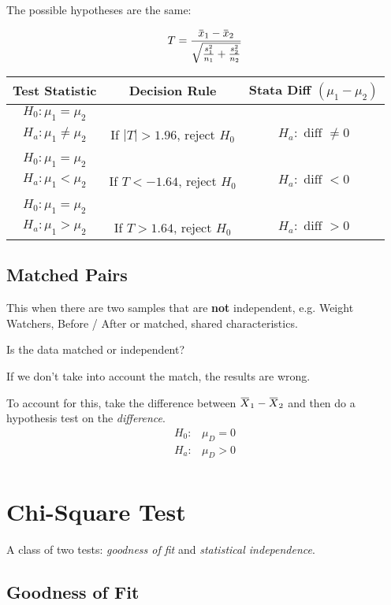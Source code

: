 \documentclass[11pt, oneside]{article}   	%
\newcommand{\overbar}[1]{\mkern 1.5mu\overline{\mkern-1.5mu#1\mkern-1.5mu}\mkern 1.5mu}
\begin{document}
The possible hypotheses are the same:

\[
T = \frac{\overbar{x}_1 - \overbar{x}_2 }  {\sqrt{\frac{s^2_1 } {n_1 } + \frac{s^2_2 } {n_2 }  } }
\]

 \begin{tabular}{ c  c c }
Test Statistic & Decision Rule & Stata Diff $(\mu_1 - \mu_2)$ \\
\hline
$H_0 : \mu_1 = \mu_2$ \\      $H_a : \mu_1 \neq \mu_2$ & If $|T| > 1.96$, reject $H_0$ & $H_a: \text{ diff } \neq 0$\\
 & \\
$H_0 : \mu_1 = \mu_2$ \\ $H_a : \mu_1 < \mu_2$      & If $T < -1.64$, reject $H_0$ & $H_a: \text{ diff } < 0$\\
 & \\
$H_0 : \mu_1 = \mu_2$ \\ $H_a : \mu_1 > \mu_2$      & If $T > 1.64$, reject $H_0$ & $H_a: \text{ diff } > 0$\\
\end{tabular}

\subsection{Matched Pairs}

This when there are two samples that are \textbf{not} independent, e.g. Weight Watchers, Before / After or matched, shared characteristics.

Is the data matched or independent?

If we don't take into account the match, the results are wrong.

To account for this, take the difference between $\overbar{X}_1 - \overbar{X}_2$ and then do a hypothesis test on the \textit{difference}. 
\begin{align*}
H_0 : & \mu_D = 0 \\
H_a : & \mu_D > 0 \\
\end{align*}

\section{Chi-Square Test}

A class of two tests: \textit{goodness of fit} and \textit{statistical independence}.

\subsection{Goodness of Fit}
\end{document}
